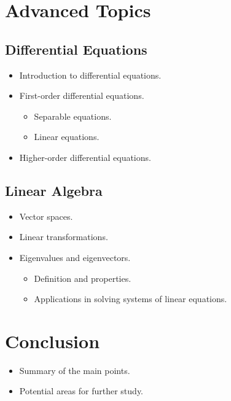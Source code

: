 \documentclass[11pt]{article}
\begin{document}
\section{Advanced Topics}

\subsection{Differential Equations}
\begin{itemize}
    \item Introduction to differential equations.
    \item First-order differential equations.
    \begin{itemize}
        \item Separable equations.
        \item Linear equations.
    \end{itemize}
    \item Higher-order differential equations.
\end{itemize}

\subsection{Linear Algebra}
\begin{itemize}
    \item Vector spaces.
    \item Linear transformations.
    \item Eigenvalues and eigenvectors.
    \begin{itemize}
        \item Definition and properties.
        \item Applications in solving systems of linear equations.
    \end{itemize}
\end{itemize}

\section{Conclusion}
\begin{itemize}
    \item Summary of the main points.
    \item Potential areas for further study.
\end{itemize}



\end{document}
